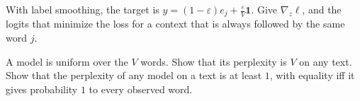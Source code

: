 \begin{notechapter}
\begin{exercise}\label{bigram-models:exr:4}
With label smoothing, the target is $y = (1 - \varepsilon)e_j + \frac\varepsilon V\mathbf 1$. Give $\nabla_z\ell$, and the logits that minimize
the loss for a context that is always followed by the same word $j$.
\end{exercise}

\begin{exercise}\label{bigram-models:exr:5}
A model is uniform over the $V$ words. Show that its perplexity is $V$ on any text. Show that the
perplexity of any model on a text is at least $1$, with equality iff it gives probability $1$ to every
observed word.
\end{exercise}
\end{notechapter}
